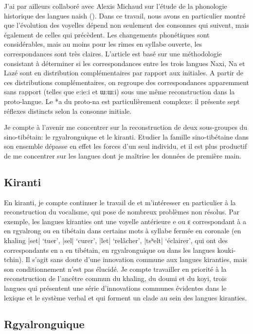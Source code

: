 \documentclass[oldfontcommands,oneside,a4paper,11pt]{memoir}
\newcommand{\ipa}[1]{{\phon #1}} %
\begin{document}
J'ai par ailleurs collaboré avec Alexis Michaud sur l'étude de la phonologie historique des langues naish (\citealt{jacques.michaud11naish}). Dans ce travail, nous avons en particulier montré que l'évolution des voyelles dépend non seulement des consonnes qui suivent, mais également de celles qui précèdent. Les changements phonétiques sont considérables, mais au moins pour les rimes en syllabe ouverte, les correspondances sont très claires. L'article est basé sur une méthodologie consistant à déterminer si les correspondances entre les trois langues Naxi, Na et Lazé sont en distribution complémentaires par rapport aux initiales. A partir de ces distributions complémentaires, on regroupe des correspondances apparemment sans rapport (telles que e:ie:i et ɯ:ɯ:i) sous une même reconstruction dans la proto-langue. Le *a du proto-na est particulièrement complexe: il présente sept réflexes distincts selon la consonne initiale. 

Je compte à l'avenir me concentrer sur la reconstruction de deux sous-groupes du sino-tibétain: le rgyalronguique et le kiranti. Etudier la famille sino-tibétaine dans son ensemble dépasse en effet les forces d'un seul individu, et il est plus productif de me concentrer sur les langues dont je maîtrise les données de première main. 

\subsection{Kiranti}

En kiranti, je compte continuer le travail de \citet{michailovsky94stops} et m'intéresser en particulier à la reconstruction du vocalisme, qui pose de nombreux problèmes non résolus. Par exemple, les langues kiranties ont une voyelle antérieure \ipa{e} ou \ipa{ɛ} correspondant  à \ipa{a} en rgyalrong ou en tibétain dans certains mots à syllabe fermée en coronale (en khaling |set| `tuer', |sel| `curer', |let| `relâcher', |tsʰelt|  `éclairer', qui ont des correspondants en a en tibétain, en rgyalronguique ou dans les langues kouki-tchin). Il s'agit sans doute d'une innovation commune aux langues kiranties, mais son conditionnement n'est pas élucidé. Je compte travailler en priorité à la reconstruction de l'ancêtre commun du khaling, du doumi et du koyi, trois langues qui présentent une série d'innovations communes évidentes dans le lexique et le système verbal et qui forment un clade au sein des langues kiranties.

\subsection{Rgyalronguique}
\end{document}
